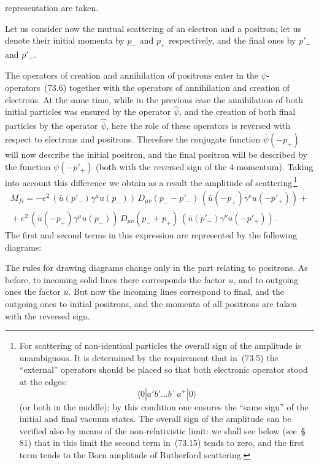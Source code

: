 representation are taken.

Let us consider now the mutual scattering of an electron and a positron; let us denote their initial momenta by $p_-$ and $p_+$ respectively, and the final ones by $p'_-$ and $p'_+$.

The operators of creation and annihilation of positrons enter in the $\psi$-operators~(73.6) together with the operators of annihilation and creation of electrons. At the same time, while in the previous case the annihilation of both initial particles was ensured by the operator $\hat{\psi}$, and the creation of both final particles by the operator $\hat{\bar{\psi}}$, here the role of these operators is reversed with respect to electrons and positrons. Therefore the conjugate function $\bar{\psi}(-p_+)$ will now describe the initial positron, and the final positron will be described by the function $\psi(-p'_+)$ (both with the reversed sign of the 4-momentum). Taking into account this difference we obtain as a result the amplitude of scattering\,\footnote{For scattering of non-identical particles the overall sign of the amplitude is unambiguous. It is determined by the requirement that in~(73.5) the ``external'' operators should be placed so that both electronic operator stood at the edges:
\[
\langle 0|a'b'\ldots b^+a^+|0\rangle
\]
(or both in the middle); by this condition one ensures the ``same sign'' of the initial and final vacuum states. The overall sign of the amplitude can be verified also by means of the non-relativistic limit: we shall see below (see~\S\,81) that in this limit the second term in~(73.15) tends to zero, and the first term tends to the Born amplitude of Rutherford scattering.}
\begin{equation}
\begin{split}
M_{fi} = -e^2\,(\bar{u}(p'_-)\gamma^\mu u(p_-))\,D_{\mu\nu}(p_- - p'_-)\,(\bar{u}(-p_+)\gamma^\nu u(-p'_+)) +{}\\
{}+ e^2\,(\bar{u}(-p_+)\gamma^\mu u(p_-))\,D_{\mu\nu}(p_- + p_+)\,(\bar{u}(p'_-)\gamma^\nu u(-p'_+)).
\end{split}
\tag{73.15}
\end{equation}
The first and second terms in this expression are represented by the following diagrams:

The rules for drawing diagrams change only in the part relating to positrons. As before, to incoming solid lines there corresponds the factor $u$, and to outgoing ones the factor $\bar{u}$. But now the incoming lines correspond to final, and the outgoing ones to initial positrons, and the momenta of all positrons are taken with the reversed sign.


